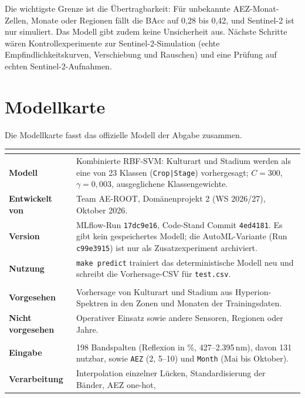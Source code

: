 \documentclass[11pt,a4paper,titlepage]{article}
\begin{document}
Die wichtigste Grenze ist die \"Ubertragbarkeit: F\"ur unbekannte
AEZ-Monat-Zellen, Monate oder Regionen f\"allt die BAcc auf 0,28 bis 0,42, und
Sentinel-2 ist nur simuliert. Das Modell gibt zudem keine Unsicherheit aus.
N\"achste Schritte w\"aren Kontrollexperimente zur Sentinel-2-Simulation (echte
Empfindlichkeitskurven, Verschiebung und Rauschen) und eine Pr\"ufung auf echten
Sentinel-2-Aufnahmen.

\newpage
\section{Modellkarte}
\label{sec:modellkarte}

Die Modellkarte fasst das offizielle Modell der Abgabe zusammen.

\begingroup
\small
\renewcommand{\arraystretch}{1.1}
\begin{tabularx}{\linewidth}{@{}>{\bfseries}p{3.1cm}X@{}}
	\toprule
	\multicolumn{2}{@{}l}{\textbf{Modelldetails}} \\
	\midrule
	Modell & Kombinierte RBF-SVM: Kulturart und Stadium werden als eine von 23 Klassen
		(\texttt{Crop|Stage}) vorhergesagt; $C=300$, $\gamma=0{,}003$, ausgeglichene
		Klassengewichte. \\
	Entwickelt von & Team AE-ROOT, Dom\"anenprojekt 2 (WS 2026/27), Oktober 2026. \\
	Version & MLflow-Run \texttt{17dc9e16}, Code-Stand Commit \texttt{4ed4181}.
		Es gibt kein gespeichertes Modell; die AutoML-Variante (Run \texttt{c99e3915})
		ist nur als Zusatzexperiment archiviert. \\
	Nutzung & \texttt{make predict} trainiert das deterministische Modell neu und schreibt
		die Vorhersage-CSV f\"ur \texttt{test.csv}. \\
	\midrule
	\multicolumn{2}{@{}l}{\textbf{Verwendung}} \\
	\midrule
	Vorgesehen & Vorhersage von Kulturart und Stadium aus Hyperion-Spektren in den Zonen und
		Monaten der Trainingsdaten. \\
	Nicht vorgesehen & Operativer Einsatz sowie andere Sensoren, Regionen oder Jahre. \\
	\midrule
	\multicolumn{2}{@{}l}{\textbf{Daten und Training}} \\
	\midrule
	Eingabe & 198 Bandspalten (Reflexion in \%, 427--2.395\,nm), davon 131 nutzbar, sowie
		\texttt{AEZ} (2, 5--10) und \texttt{Month} (Mai bis Oktober). \\
	Verarbeitung & Interpolation einzelner L\"ucken, Standardisierung der B\"ander, AEZ one-hot,

\end{tabularx}
\end{document}

